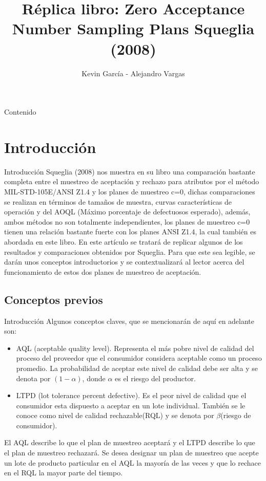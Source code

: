 \documentclass[10pt]{beamer}
\author{Kevin García - Alejandro Vargas}
\title{Réplica libro: Zero Acceptance Number Sampling Plans Squeglia (2008)}
\begin{document}
\begin{frame}[plain]
\maketitle
\end{frame}

\begin{frame}{Contenido}
\tableofcontents
\end{frame}

\section{Introducción}
\begin{frame}{Introducción}
Squeglia (2008)\cite{A0} nos muestra en su libro una comparación bastante completa entre el muestreo de aceptación y rechazo para atributos por el método MIL-STD-105E/ANSI Z1.4 y los planes de muestreo c=0, dichas comparaciones se realizan en términos de tamaños de muestra, curvas características de operación y del AOQL (Máximo porcentaje de defectuosos esperado), además, ambos métodos no son totalmente independientes, los planes de muestreo c=0 tienen una relación bastante fuerte con los planes ANSI Z1.4, la cual también es abordada en este libro. En este artículo se tratará de replicar algunos de los resultados y comparaciones obtenidos por Squeglia. Para que este sea legible, se darán unos conceptos introductorios y se contextualizará al lector acerca del funcionamiento de estos dos planes de muestreo de aceptación.
\end{frame}

\subsection{Conceptos previos}
\begin{frame}{Introducción}
Algunos conceptos claves, que se mencionarán de aquí en adelante son:
\begin{itemize}
\item AQL (aceptable quality level). Representa el más pobre nivel de calidad del proceso del proveedor que el consumidor considera aceptable como un proceso promedio. La probabilidad de aceptar este nivel de calidad debe ser alta y se denota por $(1-\alpha)$, donde $\alpha$ es el riesgo del productor.
\item LTPD (lot tolerance percent defective). Es el peor nivel de calidad que el consumidor esta dispuesto a aceptar en un lote individual. También se le conoce como nivel de calidad rechazable(RQL) y se denota por $\beta$(riesgo de consumidor).
\end{itemize}
El AQL describe lo que el plan de muestreo aceptará y el LTPD describe lo que el plan de muestreo rechazará. Se desea designar un plan de muestreo que acepte un lote de producto particular en el AQL la mayoría de las veces y que lo rechace en el RQL la mayor parte del tiempo.
\end{frame}
\end{document}

